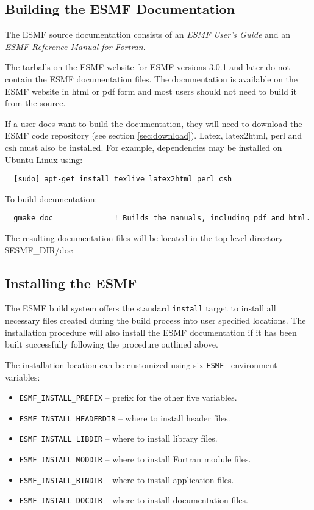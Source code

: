 \subsection{Building the ESMF Documentation}
\label{BuildDocumentation}

The ESMF source documentation consists of an {\it ESMF User's Guide}
and an {\it ESMF Reference Manual for Fortran}.

The tarballs on the ESMF website for ESMF versions 3.0.1 and later do
not contain the ESMF documentation files.  The documentation is
available on the ESMF website in html or pdf form and most users should
not need to build it from the source.

If a user does want to build the documentation, they will need to download the
ESMF code repository (see section \ref{sec:download}). Latex, latex2html, perl
and csh must also be installed. For example, dependencies may be installed on
Ubuntu Linux using:
\begin{verbatim}
  [sudo] apt-get install texlive latex2html perl csh
\end{verbatim}

\noindent To build documentation:
\begin{verbatim}
  gmake doc              ! Builds the manuals, including pdf and html.
\end{verbatim}

\noindent The resulting documentation files will be
located in the top level directory \${ESMF\_DIR}/doc

\subsection{Installing the ESMF}
\label{InstallESMF}

The ESMF build system offers the standard {\tt install} target to install all
necessary files created during the build process into user specified locations.
The installation procedure will also install the ESMF documentation if it has
been built successfully following the procedure outlined above.

The installation location can be customized using six {\tt ESMF\_} environment
variables:
\begin{itemize}
\item {\tt ESMF\_INSTALL\_PREFIX} -- prefix for the other five variables.
\item {\tt ESMF\_INSTALL\_HEADERDIR} -- where to install header files.
\item {\tt ESMF\_INSTALL\_LIBDIR} -- where to install library files.
\item {\tt ESMF\_INSTALL\_MODDIR} -- where to install Fortran module files.
\item {\tt ESMF\_INSTALL\_BINDIR} -- where to install application files.
\item {\tt ESMF\_INSTALL\_DOCDIR} -- where to install documentation files.
\end{itemize}

